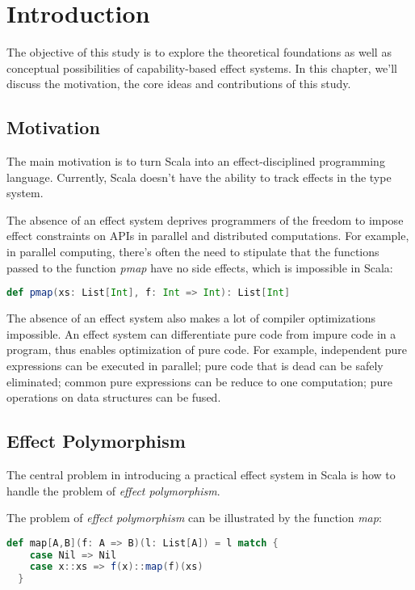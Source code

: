 \section{Introduction}

The objective of this study is to explore the theoretical foundations
as well as conceptual possibilities of capability-based effect
systems. In this chapter, we'll discuss the motivation, the core ideas
and contributions of this study.

\subsection{Motivation}

The main motivation is to turn Scala into an effect-disciplined
programming language. Currently, Scala doesn't have the ability to
track effects in the type system.

The absence of an effect system deprives programmers of the freedom to
impose effect constraints on APIs in parallel and distributed
computations. For example, in parallel computing, there's often the
need to stipulate that the functions passed to the function
\emph{pmap} have no side effects, which is impossible in Scala:

\begin{lstlisting}[language=Scala]
def pmap(xs: List[Int], f: Int => Int): List[Int]
\end{lstlisting}

The absence of an effect system also makes a lot of compiler
optimizations impossible. An effect system can differentiate pure code
from impure code in a program, thus enables optimization of pure
code. For example, independent pure expressions can be executed in
parallel; pure code that is dead can be safely eliminated; common pure
expressions can be reduce to one computation; pure operations on data
structures can be fused\cite{coutts2007stream}.

\subsection{Effect Polymorphism}

The central problem in introducing a practical effect system in Scala
is how to handle the problem of \emph{effect polymorphism}.

The problem of \emph{effect polymorphism} can be illustrated by the
function \emph{map}:

\begin{lstlisting}[language=Scala]
  def map[A,B](f: A => B)(l: List[A]) = l match {
    case Nil => Nil
    case x::xs => f(x)::map(f)(xs)
  }
\end{lstlisting}

